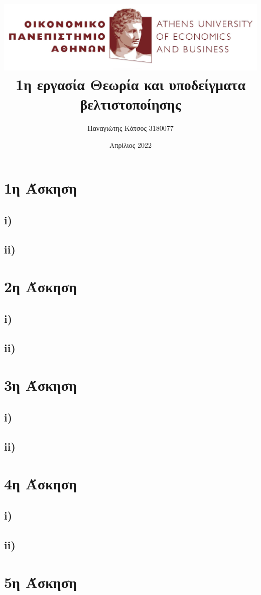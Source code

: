 \documentclass[17pt]{extarticle}
\title{\includegraphics[scale=0.5]{images/aueb.jpg} \\
\Large 1η εργασία Θεωρία και υποδείγματα βελτιστοποίησης}
\author{Παναγιώτης Κάτσος 3180077}
\date{Απρίλιος 2022}
\begin{document}
\begin{titlepage}
  \maketitle
\end{titlepage}
\section*{1η Άσκηση}
\subsection*{i)}
\subsection*{ii)}
\section*{2η Άσκηση}
\subsection*{i)}
\subsection*{ii)}
\section*{3η Άσκηση}
\subsection*{i)}
\subsection*{ii)}
\section*{4η Άσκηση}
\subsection*{i)}
\subsection*{ii)}
\section*{5η Άσκηση}
\end{document}
